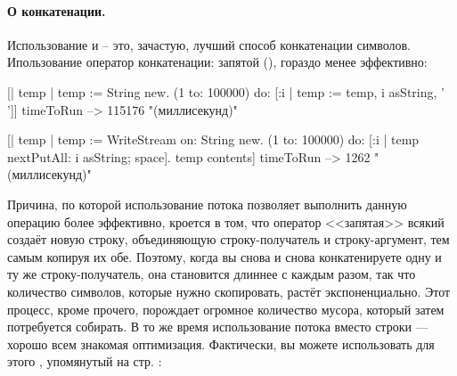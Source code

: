 \documentclass[a4paper,10pt,twoside]{book}
\begin{document}
\paragraph{О конкатенации.}
Использование  и  -- это, зачастую, лучший способ конкатенации символов. Ипользование оператор конкатенации: запятой (\ct{,}), гораздо менее эффективно: 

\begin{code}{}
[| temp |
  temp := String new.
  (1 to: 100000)
    do: [:i | temp := temp, i asString, ' ']] timeToRun --> 115176 "(миллисекунд)"

[| temp |
  temp := WriteStream on: String new.
  (1 to: 100000)
    do: [:i | temp nextPutAll: i asString; space].
  temp contents] timeToRun --> 1262 "(миллисекунд)"
\end{code}

Причина, по которой использование потока позволяет выполнить данную операцию более эффективно, кроется в том, что оператор <<запятая>> всякий создаёт новую строку, объединяющую строку-получатель и строку-аргумент, тем самым копируя их обе.
Поэтому, когда вы снова и снова конкатенируете одну и ту же строку-получатель, она становится длиннее с каждым разом, так что количество символов, которые нужно скопировать, растёт экспоненциально.
Этот процесс, кроме прочего, порождает огромное количество мусора, который затем потребуется собирать. В то же время использование потока вместо строки --- хорошо всем знакомая оптимизация.
Фактически, вы можете использовать для этого , упомянутый на стр. \pageref{sec:streamContents}:
\end{document}
